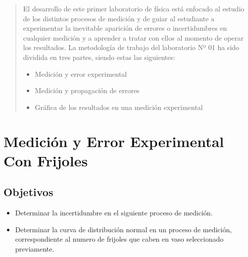 \documentclass[10pt]{article}
\begin{document}
\newpage																		

\tableofcontents 

\newpage

\begin{abstract}
    El desarrollo de este primer laboratorio de física está enfocado al estudio de los distintos procesos de medición y de guiar al estudiante a experimentar la inevitable aparición de errores o incertidumbres en cualquier medición y a aprender a tratar con ellos al momento de operar los resultados.
La metodología de trabajo del laboratorio Nº 01 ha sido dividida en tres partes, siendo estas las siguientes:
\begin{itemize}
    \item Medición y error experimental
    \item Medición y propagación de errores 
    \item Gráfica de los resultados en una medición experimental 
\end{itemize}
 
\end{abstract}
\section{Medición y Error Experimental Con Frijoles}
\subsection{Objetivos}
\begin{itemize}
    \item Determinar la incertidumbre en el siguiente proceso de medición.
    \item Determinar la curva de distribución normal en un proceso de medición, correspondiente al numero de frijoles que caben en vaso seleccionado previamente.
\end{itemize}
\end{document}
